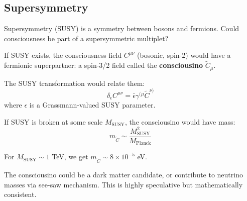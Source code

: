 \begin{advanced}
\subsection{Supersymmetry}

Supersymmetry (SUSY) is a symmetry between bosons and fermions. Could consciousness be part of a supersymmetric multiplet?

If SUSY exists, the consciousness field $C^{\mu\nu}$ (bosonic, spin-2) would have a fermionic superpartner: a spin-3/2 field called the \textbf{consciousino} $\tilde{C}_\mu$.

The SUSY transformation would relate them:
\begin{equation}
\delta_\epsilon C^{\mu\nu} = \bar{\epsilon} \gamma^{(\mu} \tilde{C}^{\nu)}
\end{equation}
where $\epsilon$ is a Grassmann-valued SUSY parameter.

If SUSY is broken at some scale $M_{\text{SUSY}}$, the consciousino would have mass:
\begin{equation}
m_{\tilde{C}} \sim \frac{M_{\text{SUSY}}^2}{M_{\text{Planck}}}
\end{equation}

For $M_{\text{SUSY}} \sim 1$ TeV, we get $m_{\tilde{C}} \sim 8\times10^{-5}$ eV.

The consciousino could be a dark matter candidate, or contribute to neutrino masses via see-saw mechanism. This is highly speculative but mathematically consistent.
\end{advanced}

